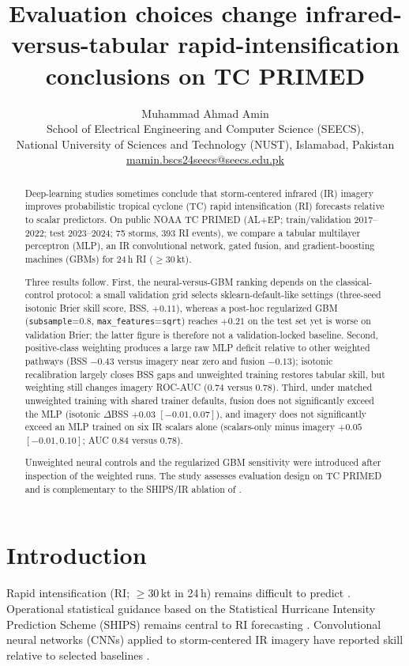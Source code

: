 \documentclass[11pt]{article}
\title{Evaluation choices change infrared-versus-tabular rapid-intensification conclusions on {TC PRIMED}}
\author{
Muhammad Ahmad Amin \\
School of Electrical Engineering and Computer Science (SEECS), \\
National University of Sciences and Technology (NUST), Islamabad, Pakistan \\
\href{mailto:mamin.bscs24seecs@seecs.edu.pk}{mamin.bscs24seecs@seecs.edu.pk}
}
\date{}
\begin{document}
\maketitle

\begin{abstract}
Deep-learning studies sometimes conclude that storm-centered infrared (IR) imagery improves probabilistic tropical cyclone (TC) rapid intensification (RI) forecasts relative to scalar predictors. On public NOAA {TC PRIMED} (AL+EP; train/validation 2017--2022; test 2023--2024; 75 storms, 393 RI events), we compare a tabular multilayer perceptron (MLP), an IR convolutional network, gated fusion, and gradient-boosting machines (GBMs) for 24\,h RI ($\geq 30$\,kt).

Three results follow. First, the neural-versus-GBM ranking depends on the classical-control protocol: a small validation grid selects sklearn-default-like settings (three-seed isotonic Brier skill score, BSS, $+0.11$), whereas a post-hoc regularized GBM (\texttt{subsample}=$0.8$, \texttt{max\_features}=\texttt{sqrt}) reaches $+0.21$ on the test set yet is worse on validation Brier; the latter figure is therefore not a validation-locked baseline. Second, positive-class weighting produces a large raw MLP deficit relative to other weighted pathways (BSS $-0.43$ versus imagery near zero and fusion $-0.13$); isotonic recalibration largely closes BSS gaps and unweighted training restores tabular skill, but weighting still changes imagery ROC-AUC ($0.74$ versus $0.78$). Third, under matched unweighted training with shared trainer defaults, fusion does not significantly exceed the MLP (isotonic $\Delta$BSS $+0.03$ $[-0.01,0.07]$), and imagery does not significantly exceed an MLP trained on six IR scalars alone (scalars-only minus imagery $+0.05$ $[-0.01,0.10]$; AUC $0.84$ versus $0.78$).

Unweighted neural controls and the regularized GBM sensitivity were introduced after inspection of the weighted runs. The study assesses evaluation design on {TC PRIMED} and is complementary to the SHIPS/IR ablation of \citet{lagerquist2025}.
\end{abstract}

\section{Introduction}
\label{sec:intro}

Rapid intensification (RI; $\geq 30$\,kt in 24\,h) remains difficult to predict \citep{kaplan2003,kaplan2010,kaplan2015}. Operational statistical guidance based on the Statistical Hurricane Intensity Prediction Scheme (SHIPS) remains central to RI forecasting \citep{kaplan2015,demaria2021}. Convolutional neural networks (CNNs) applied to storm-centered IR imagery have reported skill relative to selected baselines \citep{griffin2022}.
\end{document}

